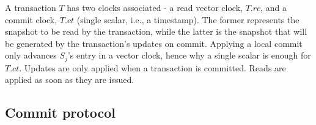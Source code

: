 \documentclass[sigplan,10pt]{acmart}
\begin{document}
A transaction $T$ has two clocks associated - a read vector clock, $T\!.\mathit{rc}$, and a commit clock, $T\!.\mathit{ct}$ (single scalar, i.e., a timestamp).
The former represents the snapshot to be read by the transaction, while the latter is the snapshot that will be generated by the transaction's updates on commit.
Applying a local commit only advances $S_j$'s entry in a vector clock, hence why a single scalar is enough for $T\!.\mathit{ct}$.
Updates are only applied when a transaction is committed. 
Reads are applied as soon as they are issued. %

\subsection{Commit protocol}

\end{document}
